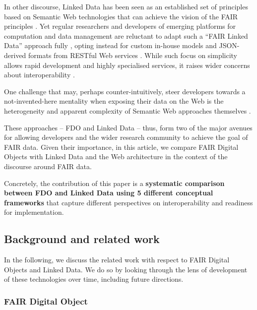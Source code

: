 In other discourse, Linked Data \cite{Bizer 2009} has been seen as an established set of principles based on Semantic Web technologies that can achieve the vision of the FAIR principles \cite{boninodasilvasantosFAIRDataPoints2016a,Hasnain 2018}. Yet regular researchers and developers of emerging platforms for computation and data management are reluctant to adapt such a ``FAIR Linked Data'' approach fully \cite{verborghSemanticWebIdentity2020a}, opting instead for custom in-house models and JSON-derived formats from RESTful Web services \cite{merono-penuelaConclusionFutureChallenges2021a,neumannAnalysisPublicREST2021a}. While such focus on simplicity allows rapid development and highly specialised services, it raises wider concerns about interoperability \cite{turcoaneLinkedDataJSONLD2014a,wilkinsonWorkflowsWhenParts2022b}.

One challenge that may, perhaps counter-intuitively, steer developers towards a not-invented-here mentality \cite{stefiDevelopersMakeUnbiased2015,stefiDevelopReuseTwo2015a} when exposing their data on the Web is the heterogeneity and apparent complexity of Semantic Web approaches themselves \cite{merono-penuelaWebDataApis2021b}.

These approaches -- FDO and Linked Data -- thus, form two of the major avenues for allowing developers and the wider research community to achieve the goal of FAIR data. Given their importance, in this article, we compare FAIR Digital Objects with Linked Data and the Web architecture in the context of the discourse around FAIR data.

Concretely, the contribution of this paper is a {\bf systematic comparison between FDO and Linked Data using 5 different conceptual frameworks} that capture different perspectives on interoperability and readiness for implementation.

\subsection{Background and related work}\label{ch3:background}

In the following, we discuss the related work with respect to FAIR Digital Objects and Linked Data. We do so by looking through the lens of development of these technologies over time, including future directions.

\subsubsection{FAIR Digital Object}\label{ch3:fdo}

